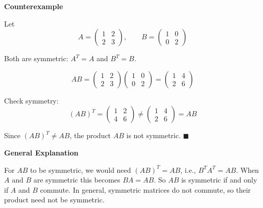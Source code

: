 \documentclass[12pt]{article}
\begin{document}
\begin{stepbox}
\textbf{Counterexample}

Let
\[
A = \begin{pmatrix} 1 & 2 \\ 2 & 3 \end{pmatrix}, \qquad
B = \begin{pmatrix} 1 & 0 \\ 0 & 2 \end{pmatrix}
\]

Both are symmetric: $A^T = A$ and $B^T = B$.

\[
AB = \begin{pmatrix} 1 & 2 \\ 2 & 3 \end{pmatrix}\begin{pmatrix} 1 & 0 \\ 0 & 2 \end{pmatrix} = \begin{pmatrix} 1 & 4 \\ 2 & 6 \end{pmatrix}
\]

Check symmetry:
\[
(AB)^T = \begin{pmatrix} 1 & 2 \\ 4 & 6 \end{pmatrix} \neq \begin{pmatrix} 1 & 4 \\ 2 & 6 \end{pmatrix} = AB
\]

Since $(AB)^T \neq AB$, the product $AB$ is not symmetric. \hfill $\blacksquare$
\end{stepbox}

\begin{stepbox}
\textbf{General Explanation}

For $AB$ to be symmetric, we would need $(AB)^T = AB$, i.e., $B^T A^T = AB$. When $A$ and $B$ are symmetric this becomes $BA = AB$. So $AB$ is symmetric if and only if $A$ and $B$ commute. In general, symmetric matrices do not commute, so their product need not be symmetric.
\end{stepbox}


\end{document}
